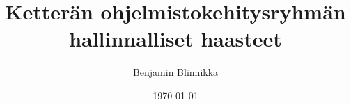 \documentclass[finnish,twoside,censored,tkt]{HYthesisML}
\title{Ketterän ohjelmistokehitysryhmän hallinnalliset haasteet}
\author{Benjamin Blinnikka}
\date{\today}
\begin{document}
\maketitle



\mytableofcontents
\mainmatter








{}  %
\printbibliography

\backmatter
\begin{appendices}
\end{appendices}
\end{document}
